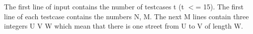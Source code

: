 The first line of input contains the number of testcases t (t $<$= 15). The first line of each testcase contains the numbers N, M. The next M lines contain three integers U V W which mean that there is one street from U to V of length W.